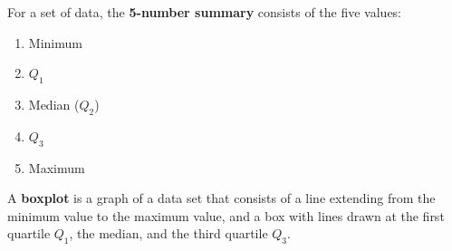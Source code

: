 \documentclass{beamer}
\begin{document}
\begin{frame}
\begin{definition}
For a set of data, the \textbf{5-number summary} consists of the five values:
\begin{enumerate}
\item Minimum
\item $Q_1$
\item Median ($Q_2$)
\item $Q_3$
\item Maximum
\end{enumerate}
\end{definition}\pause

\begin{definition}
A \textbf{boxplot} is a graph of a data set that consists of a line extending from the minimum value to the maximum value, and a box with lines drawn at the first quartile $Q_1$, the median, and the third quartile $Q_3$.

\vspace{-2mm}
\begin{center}
\end{center}
\end{definition}
\end{frame}
\end{document}
